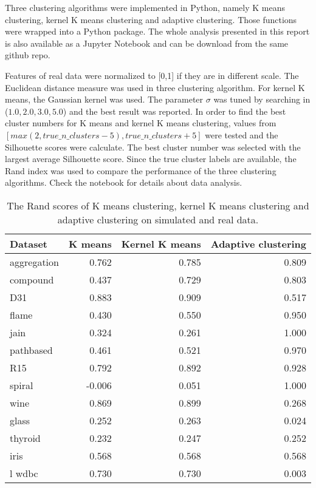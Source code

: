 \documentclass[aoas,preprint]{imsart}
\numberwithin{equation}{section}
\theoremstyle{plain}
\begin{document}
Three clustering algorithms were implemented in Python, namely K means clustering, kernel K means clustering and adaptive clustering. Those functions were wrapped into a Python package. The whole analysis presented in this report is also available as a Jupyter Notebook and can be download from the same github repo.

Features of real data were normalized to [0,1] if they are in different scale. The Euclidean distance measure was used in three clustering algorithm. For kernel K means, the Gaussian kernel was used. The parameter $\sigma$ was tuned by searching in ($1.0,2.0,3.0,5.0$) and the best result was reported.   In order to find the best cluster numbers for  K means and kernel K means clustering, values from $[max(2,true\_n\_clusters-5),true\_n\_clusters+5]$ were tested and the Silhouette scores were calculate. The best cluster number was selected with the largest average Silhouette score. Since the true cluster labels are available, the Rand index was used to compare the performance of the three clustering algorithms.  Check the notebook for details about data analysis. 



\begin{table*}
\caption{The Rand scores of K means clustering, kernel K means clustering and adaptive clustering on simulated and real data.}
\label{randscore}
\begin{tabular}{lrrr}
\hline
Dataset & \multicolumn{1}{c}{K means} & \multicolumn{1}{c}{Kernel K means} & \multicolumn{1}{c}{Adaptive clustering} \\
\hline
aggregation & 0.762 & 0.785 & 0.809  \\
compound   & 0.437 & 0.729 &   0.803 \\
D31          &    0.883 & 0.909 &  0.517 \\
flame         &  0.430  & 0.550 & 0.950 \\
jain           &    0.324  & 0.261 &   1.000\\
pathbased &    0.461 & 0.521 & 0.970 \\
R15&    0.792 & 0.892 &   0.928 \\
spiral&    -0.006 & 0.051 &   1.000\\
\hline
wine & 0.869 & 0.899  &   0.268\\
glass & 0.252 & 0.263 &  0.024\\
thyroid & 0.232 & 0.247 & 0.252\\
iris & 0.568 &  0.568 &  0.568\\
l%
wdbc & 0.730 &  0.730&  0.003	\\
\hline
\end{tabular}
\end{table*}
\end{document}
